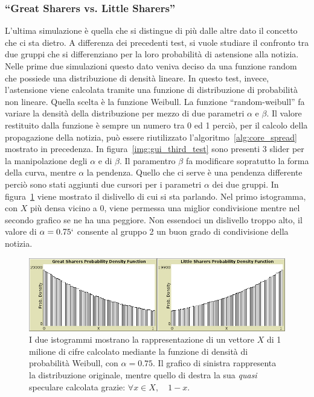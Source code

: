\subsubsection{``Great Sharers vs. Little Sharers''}

L'ultima simulazione è quella che si distingue di più dalle altre dato il concetto che ci sta dietro.
A differenza dei precedenti test, si vuole studiare il confronto tra due gruppi che si differenziano 
per la loro probabilità di astensione alla notizia. 
Nelle prime due simulazioni questo dato veniva deciso da una funzione random che possiede una distribuzione di
densità lineare.
In questo test, invece, l'astensione viene calcolata tramite una funzione di distribuzione di probabilità non lineare.
Quella scelta è la funzione Weibull\cite{biblio:weibull}.
La funzione ``random-weibull'' fa variare la densità della distribuzione per mezzo di due parametri $\alpha$ e $\beta$.
Il valore restituito dalla funzione è sempre un numero tra 0 ed 1 perciò, per il calcolo della propagazione della notizia,
può essere riutilizzato l'algoritmo~\ref{alg:core_spread} mostrato in precedenza.
In figura~\ref{img:gui_third_test} sono presenti 3 slider per la manipolazione degli $\alpha$ e di $\beta$. 
Il paramentro $\beta$ fa modificare sopratutto la forma della curva, mentre $\alpha$ la pendenza. 
Quello che ci serve è una pendenza differente perciò sono stati aggiunti due cursori per i parametri $\alpha$ dei due gruppi.
In figura~\ref{img:weibull_alpha_0_75} viene mostrato il dislivello di cui si sta parlando.
Nel primo istogramma, con $X$ più densa vicino a 0, viene permessa una miglior condivisione mentre nel secondo grafico se ne ha una peggiore.
Non essendoci un dislivello troppo alto, il valore di $\alpha = 0.75`$ consente al gruppo 2 un buon grado di condivisione della notizia.

\begin{figure}[!htb]
\centerline {
  \includegraphics[width=1.1\textwidth]{img/weibull-alpha-0.75.png}
}
\caption[caption for img/weibull-alpha-0.75.png]{I due istogrammi mostrano la rappresentazione di un vettore $X$ di 1 milione di cifre 
calcolato mediante la funzione di densità di probabilità Weibull, con $\alpha = 0.75$.
Il grafico di sinistra rappresenta la distribuzione originale, 
mentre quello di destra la sua \emph{quasi \protect\footnotemark} speculare calcolata grazie: $\forall x \in X, \quad 1 - x$.}
\label{img:weibull_alpha_0_75}
\end{figure}










